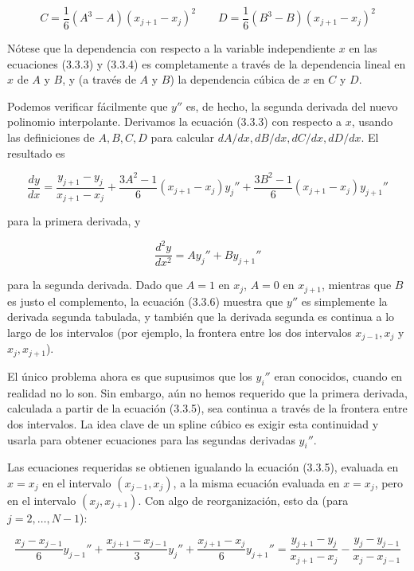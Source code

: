 \documentclass[10pt,a4paper]{book}
\begin{document}
\[
C = \frac{1}{6}(A^3 - A)(x_{j+1} - x_j)^2 \qquad D = \frac{1}{6}(B^3 - B)(x_{j+1} - x_j)^2 \tag{3.3.4}
\]

Nótese que la dependencia con respecto a la variable independiente \( x \) en las ecuaciones (3.3.3) y (3.3.4) es completamente a través de la dependencia lineal en \( x \) de \( A \) y \( B \), y (a través de \( A \) y \( B \)) la dependencia cúbica de \( x \) en \( C \) y \( D \).

Podemos verificar fácilmente que \( y'' \) es, de hecho, la segunda derivada del nuevo polinomio interpolante. Derivamos la ecuación (3.3.3) con respecto a \( x \), usando las definiciones de \( A, B, C, D \) para calcular \( dA/dx, dB/dx, dC/dx, dD/dx \). El resultado es

\[
\frac{dy}{dx} = \frac{y_{j+1} - y_j}{x_{j+1} - x_j} + \frac{3A^2 - 1}{6}(x_{j+1} - x_j)y_j'' + \frac{3B^2 - 1}{6}(x_{j+1} - x_j)y_{j+1}'' \tag{3.3.5}
\]

para la primera derivada, y

\[
\frac{d^2y}{dx^2} = A y_j'' + B y_{j+1}'' \tag{3.3.6}
\]

para la segunda derivada. Dado que \( A = 1 \) en \( x_j \), \( A = 0 \) en \( x_{j+1} \), mientras que \( B \) es justo el complemento, la ecuación (3.3.6) muestra que \( y'' \) es simplemente la derivada segunda tabulada, y también que la derivada segunda es continua a lo largo de los intervalos (por ejemplo, la frontera entre los dos intervalos \( x_{j-1}, x_j \) y \( x_j, x_{j+1} \)).

El único problema ahora es que supusimos que los \( y_i'' \) eran conocidos, cuando en realidad no lo son. Sin embargo, aún no hemos requerido que la primera derivada, calculada a partir de la ecuación (3.3.5), sea continua a través de la frontera entre dos intervalos. La idea clave de un spline cúbico es exigir esta continuidad y usarla para obtener ecuaciones para las segundas derivadas \( y_i'' \).

Las ecuaciones requeridas se obtienen igualando la ecuación (3.3.5), evaluada en \( x = x_j \) en el intervalo \( (x_{j-1}, x_j) \), a la misma ecuación evaluada en \( x = x_j \), pero en el intervalo \( (x_j, x_{j+1}) \). Con algo de reorganización, esto da (para \( j = 2, \dots, N-1 \)):

\[
\frac{x_j - x_{j-1}}{6} y_{j-1}'' + \frac{x_{j+1} - x_{j-1}}{3} y_j'' + \frac{x_{j+1} - x_j}{6} y_{j+1}'' = \frac{y_{j+1} - y_j}{x_{j+1} - x_j} - \frac{y_j - y_{j-1}}{x_j - x_{j-1}} \tag{3.3.7}
\]
\end{document}
